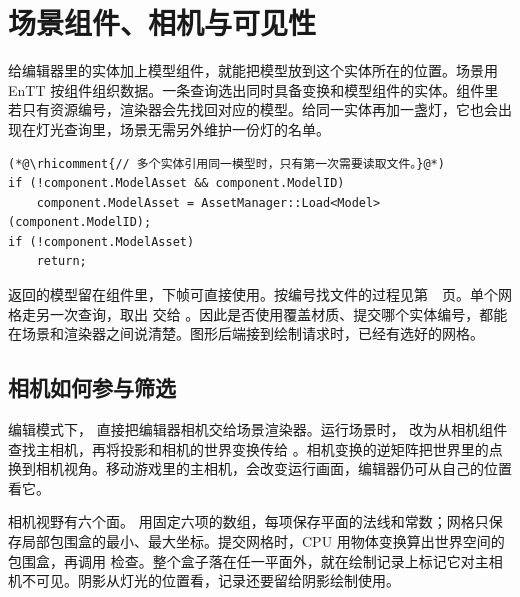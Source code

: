 \clearpage
\section{场景组件、相机与可见性}\label{sec:data-scene}
给编辑器里的实体加上模型组件，就能把模型放到这个实体所在的位置。场景用 EnTT 按组件组织数据。一条查询选出同时具备变换和模型组件的实体。组件里若只有资源编号，渲染器会先找回对应的模型。给同一实体再加一盏灯，它也会出现在灯光查询里，场景无需另外维护一份灯的名单。

\begin{lstlisting}
(*@\rhicomment{// 多个实体引用同一模型时，只有第一次需要读取文件。}@*)
if (!component.ModelAsset && component.ModelID)
    component.ModelAsset = AssetManager::Load<Model>(component.ModelID);
if (!component.ModelAsset)
    return;
\end{lstlisting}

返回的模型留在组件里，下帧可直接使用。按编号找文件的过程见第~\pageref{sec:data-assets}~页。单个网格走另一次查询，取出  交给 。因此是否使用覆盖材质、提交哪个实体编号，都能在场景和渲染器之间说清楚。图形后端接到绘制请求时，已经有选好的网格。

\subsection{相机如何参与筛选}
编辑模式下， 直接把编辑器相机交给场景渲染器。运行场景时， 改为从相机组件查找主相机，再将投影和相机的世界变换传给 。相机变换的逆矩阵把世界里的点换到相机视角。移动游戏里的主相机，会改变运行画面，编辑器仍可从自己的位置看它。

相机视野有六个面。 用固定六项的数组，每项保存平面的法线和常数；网格只保存局部包围盒的最小、最大坐标。提交网格时，CPU 用物体变换算出世界空间的包围盒，再调用  检查。整个盒子落在任一平面外，就在绘制记录上标记它对主相机不可见。阴影从灯光的位置看，记录还要留给阴影绘制使用。


